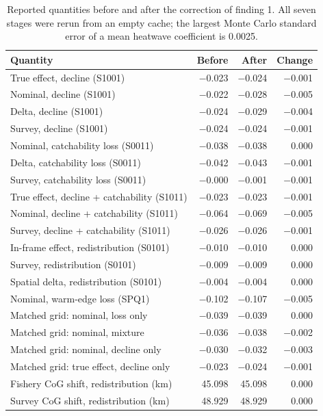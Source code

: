 \documentclass[11pt,a4paper]{article}
\begin{document}
\begin{table}[htbp]
\centering\small
\caption{Reported quantities before and after the correction of finding 1. All seven stages were rerun from an empty cache; the largest Monte Carlo standard error of a mean heatwave coefficient is 0.0025.}
\label{tab:moved}
\begin{tabular}{@{}lrrr@{}}
\toprule
Quantity & Before & After & Change \\
\midrule
True effect, decline (S1001) & $-$0.023 & $-$0.024 & $-$0.001 \\
Nominal, decline (S1001) & $-$0.022 & $-$0.028 & $-$0.005 \\
Delta, decline (S1001) & $-$0.024 & $-$0.029 & $-$0.004 \\
Survey, decline (S1001) & $-$0.024 & $-$0.024 & $-$0.001 \\
Nominal, catchability loss (S0011) & $-$0.038 & $-$0.038 & 0.000 \\
Delta, catchability loss (S0011) & $-$0.042 & $-$0.043 & $-$0.001 \\
Survey, catchability loss (S0011) & $-$0.000 & $-$0.001 & $-$0.001 \\
True effect, decline + catchability (S1011) & $-$0.023 & $-$0.023 & $-$0.001 \\
Nominal, decline + catchability (S1011) & $-$0.064 & $-$0.069 & $-$0.005 \\
Survey, decline + catchability (S1011) & $-$0.026 & $-$0.026 & $-$0.001 \\
In-frame effect, redistribution (S0101) & $-$0.010 & $-$0.010 & 0.000 \\
Survey, redistribution (S0101) & $-$0.009 & $-$0.009 & 0.000 \\
Spatial delta, redistribution (S0101) & $-$0.004 & $-$0.004 & 0.000 \\
Nominal, warm-edge loss (SPQ1) & $-$0.102 & $-$0.107 & $-$0.005 \\
Matched grid: nominal, loss only & $-$0.039 & $-$0.039 & 0.000 \\
Matched grid: nominal, mixture & $-$0.036 & $-$0.038 & $-$0.002 \\
Matched grid: nominal, decline only & $-$0.030 & $-$0.032 & $-$0.003 \\
Matched grid: true effect, decline only & $-$0.023 & $-$0.024 & $-$0.001 \\
Fishery CoG shift, redistribution (km) & 45.098 & 45.098 & 0.000 \\
Survey CoG shift, redistribution (km) & 48.929 & 48.929 & 0.000 \\

\end{tabular}
\end{table}
\end{document}
